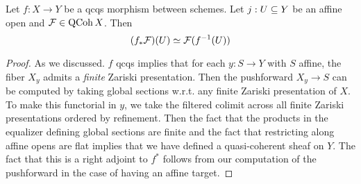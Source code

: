 \documentclass[./main.tex]{subfiles}
\begin{document}
\begin{prop}
  
  Let $f : X \to Y$ be a qcqs morphism between schemes.
  Let $j : U \subseteq Y$ be an affine open and $\mathcal{F} \in \operatorname{QCoh} X$.
  Then \[
    (f_* \mathcal{F})(U) \simeq \mathcal{F}(f^{-1}(U))  
  \]
\end{prop}
\begin{proof}
  As we discussed.
  $f$ qcqs implies that
  for each $y : S \to Y$ with $S$ affine,
  the fiber $X_y$ admits a \emph{finite} Zariski presentation.
  Then the pushforward $X_y \to S$ can be computed
  by taking global sections w.r.t.
  any finite Zariski presentation of $X$.
  To make this functorial in $y$,
  we take the filtered colimit across all finite Zariski presentations
  ordered by refinement.
  Then the fact that the products in the equalizer
  defining global sections are finite
  and the fact that restricting along affine opens are flat
  implies that we have defined a quasi-coherent sheaf on $Y$.
  The fact that this is a right adjoint to $f^*$
  follows from our computation of the pushforward
  in the case of having an affine target.
\end{proof}
\end{document}

